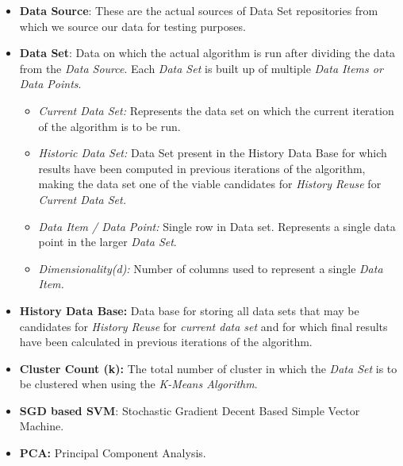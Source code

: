 \begin{itemize}
	\item \textbf{Data Source}: These are the actual sources of Data Set repositories from which we source our data for testing purposes.
	\item \textbf{Data Set}: Data on which the actual algorithm is run after dividing the data from the \textit{Data Source}. Each \textit{Data Set} is built up of multiple \textit{Data Items or Data Points}.
	\begin{itemize}
		\item \textit{Current Data Set:} Represents the data set on which the current iteration of the algorithm is to be run.
		\item \textit{Historic Data Set:} Data Set present in the History Data Base for which results have been computed in previous iterations of the algorithm, making the data set one of the viable candidates for \textit{History Reuse} for \textit{Current Data Set.}
		\item \textit{Data Item / Data Point:} Single row in Data set. Represents a single data point in the larger \textit{Data Set}.
		\item \textit{Dimensionality(d):} Number of columns used to represent a single \textit{Data Item.}
	\end{itemize}
	\item \textbf{History Data Base:} Data base for storing all data sets that may be candidates for \textit{History Reuse} for \textit{current data set} and for which final results have been calculated in previous iterations of the algorithm.
	\item \textbf{Cluster Count (k):} The total number of cluster in which the \textit{Data Set} is to be clustered when using the \textit{K-Means Algorithm}.
	\item \textbf{SGD based SVM}: Stochastic Gradient Decent Based Simple Vector Machine. \cite{sgd_svm}
	\item \textbf{PCA: } Principal Component Analysis. \cite{pca}\cite{pca_visual}	
\end{itemize}


